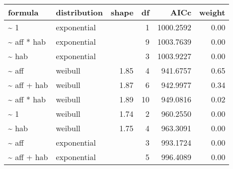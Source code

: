 \begin{table}[ht]
\centering
\begin{tabular}{llrrrr}
 formula & distribution & shape & df & AICc & weight \\ 
  \hline
\~{} 1 & exponential &  & 1 & 1000.2592 & 0.00 \\ 
  \~{} aff * hab & exponential &  & 9 & 1003.7639 & 0.00 \\ 
  \~{} hab & exponential &  & 3 & 1003.9227 & 0.00 \\ 
  \~{} aff & weibull & 1.85 & 4 & 941.6757 & 0.65 \\ 
  \~{} aff + hab & weibull & 1.87 & 6 & 942.9977 & 0.34 \\ 
  \~{} aff * hab & weibull & 1.89 & 10 & 949.0816 & 0.02 \\ 
  \~{} 1 & weibull & 1.74 & 2 & 960.2550 & 0.00 \\ 
  \~{} hab & weibull & 1.75 & 4 & 963.3091 & 0.00 \\ 
  \~{} aff & exponential &  & 3 & 993.1724 & 0.00 \\ 
  \~{} aff + hab & exponential &  & 5 & 996.4089 & 0.00 \\ 
  \end{tabular}
\label{tab:brach}
\end{table}

